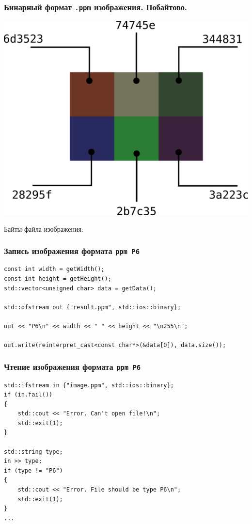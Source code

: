 \documentclass[10pt,pdf,hyperref={unicode}]{beamer}
\begin{document}
\begin{frame}[fragile]
\frametitle{Бинарный формат \texttt{.ppm} изображения. Побайтово.} 
\begin{multicols}{2}
\includegraphics[scale=0.45]{./images/tiny_new_wn_hex.png}

\vfill
Байты файла изображения:
\noindent{}
\end{multicols}
\end{frame}


\begin{frame}[fragile]
\frametitle{Запись изображения формата \texttt{ppm P6} } 
\begin{lstlisting}
const int width = getWidth();
const int height = getHeight();
std::vector<unsigned char> data = getData();

std::ofstream out {"result.ppm", std::ios::binary};

out << "P6\n" << width << " " << height << "\n255\n";

out.write(reinterpret_cast<const char*>(&data[0]), data.size());
\end{lstlisting}
\end{frame}


\begin{frame}[fragile]
\frametitle{Чтение изображения формата \texttt{ppm P6} } 
\begin{lstlisting}
std::ifstream in {"image.ppm", std::ios::binary};
if (in.fail()) 
{
    std::cout << "Error. Can't open file!\n";
    std::exit(1);
}

std::string type;
in >> type;
if (type != "P6") 
{
    std::cout << "Error. File should be type P6\n";
    std::exit(1);
}
...
\end{lstlisting}
\end{frame}
\end{document}
